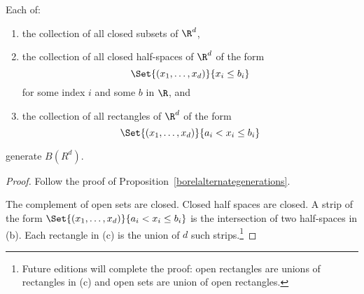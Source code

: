 \begin{proposition}
Each of:
  \begin{enumerate}
    \item the collection of all closed subsets of $\R^d$,
    \item the collection of all closed half-spaces of $\R^d$ of the form
      \[
\Set{(x_1, \dots , x_d)}{x_i \leq b_i}
      \]
for some index $i$ and some $b$ in $\R$, and
    \item the collection of all rectangles of $\R^d$ of the form
      \[
\Set{(x_1, \dots , x_d)}{a_i < x_i \leq b_i}
      \]
  \end{enumerate}
generate $B(R^d)$.\end{proposition}
\begin{proof}Follow the proof of Proposition~\ref{borelalternategenerations}.

The complement of open sets are closed.
Closed half spaces are closed.
A strip of the form $\Set{(x_1, \dots , x_d)}{a_i < x_i \leq b_i}$ is the intersection of two half-spaces in (b).
Each rectangle in (c) is the union of $d$ such strips.\footnote{Future editions will complete the proof:
open rectangles are unions of
rectangles in (c) and
open sets are union of open rectangles.}
\end{proof}